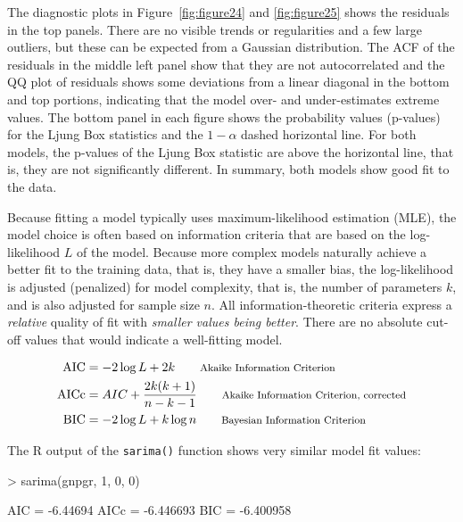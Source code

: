 The diagnostic plots in Figure~\ref{fig:figure24} and \ref{fig:figure25} shows the residuals in the top panels. There are no visible trends or regularities and a few large outliers, but these can be expected from a Gaussian distribution. The ACF of the residuals in the middle left panel show that they are not autocorrelated and the QQ plot of residuals shows some deviations from a linear diagonal in the bottom and top portions, indicating that the model over- and under-estimates extreme values. The bottom panel in each figure shows the probability values (p-values) for the Ljung Box statistics and the $1-\alpha$ dashed horizontal line. For both models, the p-values of the Ljung Box statistic are above the horizontal line, that is, they are not significantly different. In summary, both models show good fit to the data.

Because fitting a model typically uses maximum-likelihood estimation (MLE), the model choice is often based on information criteria that are based on the log-likelihood $L$ of the model. Because more complex models naturally achieve a better fit to the training data, that is, they have a smaller bias, the log-likelihood is adjusted (penalized) for model complexity, that is, the number of parameters $k$, and is also adjusted for sample size $n$. All information-theoretic criteria express a \emph{relative} quality of fit with \emph{smaller values being better}. There are no absolute cut-off values that would indicate a well-fitting model.

\begin{align*}
\operatorname{AIC} &= -2 \log L + 2k  \qquad \text{\footnotesize Akaike Information Criterion}\index{Akaike information criterion}\index{AIC|see{Akaike information criterion}}\\
\operatorname{AICc} &= AIC + \frac{2k(k+1)}{n-k-1} \qquad \text{\footnotesize Akaike Information Criterion, corrected}\\
\operatorname{BIC} &= -2 \log L + k \log n \qquad \text{\footnotesize Bayesian Information Criterion}\index{Bayesian information criterion}\index{BIC|see{Bayesian information criterion}}
\end{align*}

\noindent The R output of the \texttt{sarima()} function shows very similar model fit values:

\begin{samepage}
\begin{textcode}
> sarima(gnpgr, 1, 0, 0)

AIC = -6.44694  AICc = -6.446693  BIC = -6.400958 
\end{textcode}
\end{samepage}

